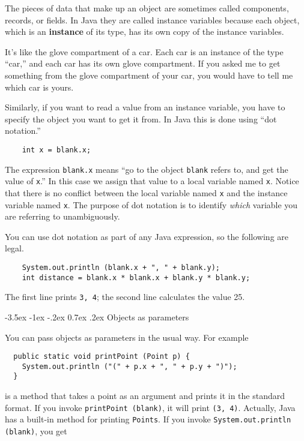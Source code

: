 \documentclass{book}
\makeatletter
\renewcommand{\section}{\@startsection 
    {section} {1} {0mm}%
    {-3.5ex \@plus -1ex \@minus -.2ex}%
    {0.7ex \@plus.2ex}%
    {\normalfont\Large\bfseries}}
\makeatother
\begin{document}
The pieces of data that make up an object are sometimes called
components, records, or fields.  In Java they are called instance
variables because each object, which is an {\bf instance} of its
type, has its own copy of the instance variables.

It's like the glove compartment of a car.  Each car is an instance
of the type ``car,'' and each car has its own glove compartment.  If
you asked me to get something from the glove compartment of your car,
you would have to tell me which car is yours.


Similarly, if you want to read a value from an instance variable, you
have to specify the object you want to get it from.  In Java this is
done using ``dot notation.''

\begin{verbatim}
    int x = blank.x;
\end{verbatim}
%
The expression {\tt blank.x} means ``go to the object {\tt blank}
refers to, and get the value of {\tt x}.''  In this case we assign
that value to a local variable named {\tt x}.  Notice that there is no
conflict between the local variable named {\tt x} and the instance
variable named {\tt x}.  The purpose of dot notation is to identify
{\em which} variable you are referring to unambiguously.

You can use dot notation as part of any Java expression, so the
following are legal.

\begin{verbatim}
    System.out.println (blank.x + ", " + blank.y);
    int distance = blank.x * blank.x + blank.y * blank.y;
\end{verbatim}
%
The first line prints {\tt 3, 4}; the second line calculates
the value 25.

\section{Objects as parameters}

You can pass objects as parameters in the usual way.  For
example

\begin{verbatim}
  public static void printPoint (Point p) {
    System.out.println ("(" + p.x + ", " + p.y + ")");
  }
\end{verbatim}
%
is a method that takes a point as an argument and prints it in
the standard format.  If you invoke {\tt printPoint (blank)},
it will print {\tt (3, 4)}.  Actually, Java has a built-in
method for printing {\tt Points}.  If you invoke
{\tt System.out.println (blank)}, you get
\end{document}
